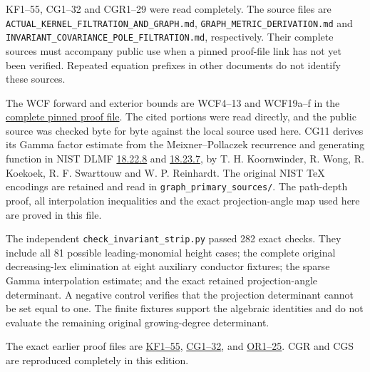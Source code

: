 \documentclass[11pt]{article}
\begin{document}
KF1--55, CG1--32 and CGR1--29 were read completely. The source files are \nolinkurl{ACTUAL_KERNEL_FILTRATION_AND_GRAPH.md}, \nolinkurl{GRAPH_METRIC_DERIVATION.md} and \nolinkurl{INVARIANT_COVARIANCE_POLE_FILTRATION.md}, respectively. Their complete sources must accompany public use when a pinned proof-file link has not yet been verified. Repeated equation prefixes in other documents do not identify these sources.

The WCF forward and exterior bounds are WCF4--13 and WCF19a--f in the \href{https://github.com/KokunoYumeto/zeta-function-research-reader/blob/52274804051e325c8a6ef69c17b3958cc2caba0a/workbenches/splitzero-tandem/continuations/20260920-gamma-and-finite-derivative/providers/WEIGHTED_CONDUCTOR_FORWARD.tex}{complete pinned proof file}. The cited portions were read directly, and the public source was checked byte for byte against the local source used here. CG11 derives its Gamma factor estimate from the Meixner--Pollaczek recurrence and generating function in NIST DLMF \href{https://dlmf.nist.gov/18.22.E8}{18.22.8} and \href{https://dlmf.nist.gov/18.23.E7}{18.23.7}, by T. H. Koornwinder, R. Wong, R. Koekoek, R. F. Swarttouw and W. P. Reinhardt. The original NIST TeX encodings are retained and read in \nolinkurl{graph_primary_sources/}. The path-depth proof, all interpolation inequalities and the exact projection-angle map used here are proved in this file.

The independent \nolinkurl{check_invariant_strip.py} passed 282 exact checks. They include all 81 possible leading-monomial height cases; the complete original decreasing-lex elimination at eight auxiliary conductor fixtures; the sparse Gamma interpolation estimate; and the exact retained projection-angle determinant. A negative control verifies that the projection determinant cannot be set equal to one. The finite fixtures support the algebraic identities and do not evaluate the remaining original growing-degree determinant.

The exact earlier proof files are \href{https://github.com/KokunoYumeto/zeta-function-research-reader/blob/0fd693c844aad9117e30ec447c59864a28af10f3/workbenches/splitzero-tandem/continuations/20260921-native-spectral-real-pair/003/ACTUAL_KERNEL_FILTRATION_AND_GRAPH.tex\#L12}{KF1--55}, \href{https://github.com/KokunoYumeto/zeta-function-research-reader/blob/0fd693c844aad9117e30ec447c59864a28af10f3/workbenches/splitzero-tandem/continuations/20260921-native-spectral-real-pair/003/COMPLETE_CONDUCTOR_GRAPH_METRIC.tex}{CG1--32}, and \href{https://github.com/KokunoYumeto/zeta-function-research-reader/blob/0fd693c844aad9117e30ec447c59864a28af10f3/workbenches/splitzero-tandem/continuations/20260921-native-spectral-real-pair/003/COMPLETE_CONDUCTOR_ROOT_GEOMETRY.tex\#L38}{OR1--25}. CGR and CGS are reproduced completely in this edition.
\end{document}
